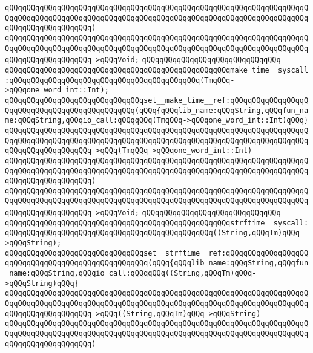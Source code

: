 \verb|qQQqqQQqqQQqqQQqqQQqqQQqqQQqqQQqqQQqqQQqqQQqqQQqqQQqqQQqqQQqqQQqqQQqqQQqqQQqqQQqqQQqqQQqqQQqqQQqqQQqqQQqqQQqqQQqqQQqqQQqqQQqqQQqqQQqqQQqqQQqqQQqqQQqqQQqqQQqqQQq)|\newline
\verb|qQQqqQQqqQQqqQQqqQQqqQQqqQQqqQQqqQQqqQQqqQQqqQQqqQQqqQQqqQQqqQQqqQQqqQQqqQQqqQQqqQQqqQQqqQQqqQQqqQQqqQQqqQQqqQQqqQQqqQQqqQQqqQQqqQQqqQQqqQQqqQQqqQQqqQQqqQQqqQQq->qQQqVoid;|\newline
\verb|qQQqqQQqqQQqqQQqqQQqqQQqqQQqqQQq|\newline
\verb|qQQqqQQqqQQqqQQqqQQqqQQqqQQqqQQqqQQqqQQqqQQqqQQqqQQqmake_time__syscall:qQQqqQQqqQQqqQQqqQQqqQQqqQQqqQQqqQQqqQQqqQQq(TmqQQq->qQQqone_word_int::Int);|\newline
\verb|qQQqqQQqqQQqqQQqqQQqqQQqqQQqqQQqset__make_time__ref:qQQqqQQqqQQqqQQqqQQqqQQqqQQqqQQqqQQqqQQqqQQqqQQq(qQQq{qQQqlib_name:qQQqString,qQQqfun_name:qQQqString,qQQqio_call:qQQqqQQq(TmqQQq->qQQqone_word_int::Int)qQQq}|\newline
\verb|qQQqqQQqqQQqqQQqqQQqqQQqqQQqqQQqqQQqqQQqqQQqqQQqqQQqqQQqqQQqqQQqqQQqqQQqqQQqqQQqqQQqqQQqqQQqqQQqqQQqqQQqqQQqqQQqqQQqqQQqqQQqqQQqqQQqqQQqqQQqqQQqqQQqqQQqqQQqqQQq->qQQq(TmqQQq->qQQqone_word_int::Int)|\newline
\verb|qQQqqQQqqQQqqQQqqQQqqQQqqQQqqQQqqQQqqQQqqQQqqQQqqQQqqQQqqQQqqQQqqQQqqQQqqQQqqQQqqQQqqQQqqQQqqQQqqQQqqQQqqQQqqQQqqQQqqQQqqQQqqQQqqQQqqQQqqQQqqQQqqQQqqQQqqQQqqQQq)|\newline
\verb|qQQqqQQqqQQqqQQqqQQqqQQqqQQqqQQqqQQqqQQqqQQqqQQqqQQqqQQqqQQqqQQqqQQqqQQqqQQqqQQqqQQqqQQqqQQqqQQqqQQqqQQqqQQqqQQqqQQqqQQqqQQqqQQqqQQqqQQqqQQqqQQqqQQqqQQqqQQqqQQq->qQQqVoid;|\newline
\verb|qQQqqQQqqQQqqQQqqQQqqQQqqQQqqQQq|\newline
\verb|qQQqqQQqqQQqqQQqqQQqqQQqqQQqqQQqqQQqqQQqqQQqqQQqqQQqstrftime__syscall:qQQqqQQqqQQqqQQqqQQqqQQqqQQqqQQqqQQqqQQqqQQqqQQq((String,qQQqTm)qQQq->qQQqString);|\newline
\verb|qQQqqQQqqQQqqQQqqQQqqQQqqQQqqQQqset__strftime__ref:qQQqqQQqqQQqqQQqqQQqqQQqqQQqqQQqqQQqqQQqqQQqqQQqqQQq(qQQq{qQQqlib_name:qQQqString,qQQqfun_name:qQQqString,qQQqio_call:qQQqqQQq((String,qQQqTm)qQQq->qQQqString)qQQq}|\newline
\verb|qQQqqQQqqQQqqQQqqQQqqQQqqQQqqQQqqQQqqQQqqQQqqQQqqQQqqQQqqQQqqQQqqQQqqQQqqQQqqQQqqQQqqQQqqQQqqQQqqQQqqQQqqQQqqQQqqQQqqQQqqQQqqQQqqQQqqQQqqQQqqQQqqQQqqQQqqQQqqQQq->qQQq((String,qQQqTm)qQQq->qQQqString)|\newline
\verb|qQQqqQQqqQQqqQQqqQQqqQQqqQQqqQQqqQQqqQQqqQQqqQQqqQQqqQQqqQQqqQQqqQQqqQQqqQQqqQQqqQQqqQQqqQQqqQQqqQQqqQQqqQQqqQQqqQQqqQQqqQQqqQQqqQQqqQQqqQQqqQQqqQQqqQQqqQQqqQQq)|\newline
